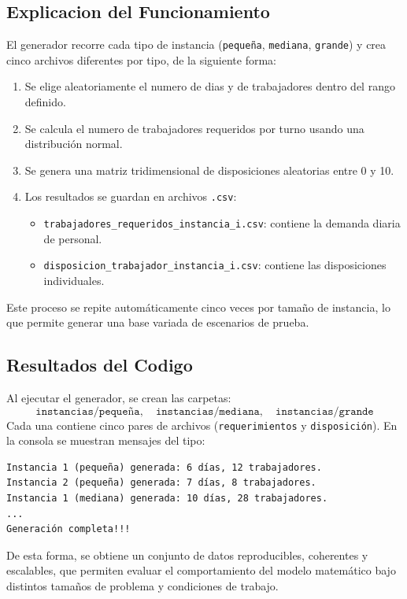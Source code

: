\documentclass{article}
\begin{document}
\subsection*{Explicacion del Funcionamiento}
El generador recorre cada tipo de instancia (\texttt{pequeña}, \texttt{mediana}, \texttt{grande}) y crea cinco archivos diferentes por tipo, de la siguiente forma:

\begin{enumerate}
    \item Se elige aleatoriamente el numero de dias y de trabajadores dentro del rango definido.
    \item Se calcula el numero de trabajadores requeridos por turno usando una distribución normal.
    \item Se genera una matriz tridimensional de disposiciones aleatorias entre 0 y 10.
    \item Los resultados se guardan en archivos \texttt{.csv}:
    \begin{itemize}
        \item \texttt{trabajadores\_requeridos\_instancia\_i.csv}: contiene la demanda diaria de personal.
        \item \texttt{disposicion\_trabajador\_instancia\_i.csv}: contiene las disposiciones individuales.
    \end{itemize}
\end{enumerate}

Este proceso se repite automáticamente cinco veces por tamaño de instancia, lo que permite generar una base variada de escenarios de prueba.

\subsection*{Resultados del Codigo}
Al ejecutar el generador, se crean las carpetas:
\[
\texttt{instancias/pequeña}, \quad \texttt{instancias/mediana}, \quad \texttt{instancias/grande}
\]
Cada una contiene cinco pares de archivos (\texttt{requerimientos} y \texttt{disposición}).  
En la consola se muestran mensajes del tipo:

\begin{verbatim}
Instancia 1 (pequeña) generada: 6 días, 12 trabajadores.
Instancia 2 (pequeña) generada: 7 días, 8 trabajadores.
Instancia 1 (mediana) generada: 10 días, 28 trabajadores.
...
Generación completa!!!
\end{verbatim}

De esta forma, se obtiene un conjunto de datos reproducibles, coherentes y escalables, que permiten evaluar el comportamiento del modelo matemático bajo distintos tamaños de problema y condiciones de trabajo.
\end{document}
